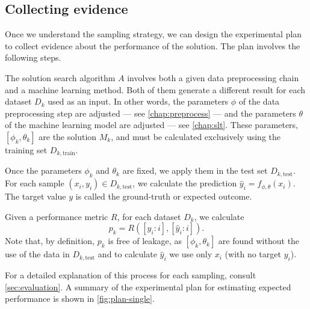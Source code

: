 
\subsection{Collecting evidence}

Once we understand the sampling strategy, we can design the experimental plan to collect
evidence about the performance of the solution.  The plan involves the following steps.

The solution search algorithm $A$ involves both a
given data preprocessing chain and a machine learning method.  Both of them generate a
different result for each dataset $D_k$ used as an input.  In other words, the parameters
$\phi$ of the data preprocessing step are adjusted --- see \cref{chap:preprocess} --- and the
parameters $\theta$ of the machine learning model are adjusted --- see \cref{chap:slt}.
These parameters, $\left[\phi_k, \theta_k\right]$ are the solution $M_k$, and must be
calculated exclusively using the training set $D_{k,\text{train}}$.

Once the parameters $\phi_k$ and $\theta_k$ are fixed, we apply them
in the test set $D_{k,\text{test}}$.  For each sample $(x_i, y_i) \in D_{k,\text{test}}$,
we calculate the prediction $\hat{y}_i = f_{\phi,\theta}(x_i)$.  The target value $y$ is
called the ground-truth or expected outcome.

Given a performance metric $R$, for each dataset $D_k$, we calculate
$$p_k = R\!\left(\left[y_i : i\right], \left[\hat{y}_i : i\right]\right)\text{.}$$
Note that, by definition, $p_k$ is free of \gls{leakage}, as $\left[\phi_k,
\theta_k\right]$ are found without the use of the data in $D_{k,\text{test}}$ and to
calculate $\hat{y}_i$ we use only $x_i$ (with no target $y_i$).

For a detailed explanation of this process for each sampling, consult
\cref{sec:evaluation}.
A summary of the experimental plan for estimating expected performance is shown in
\cref{fig:plan-single}.

